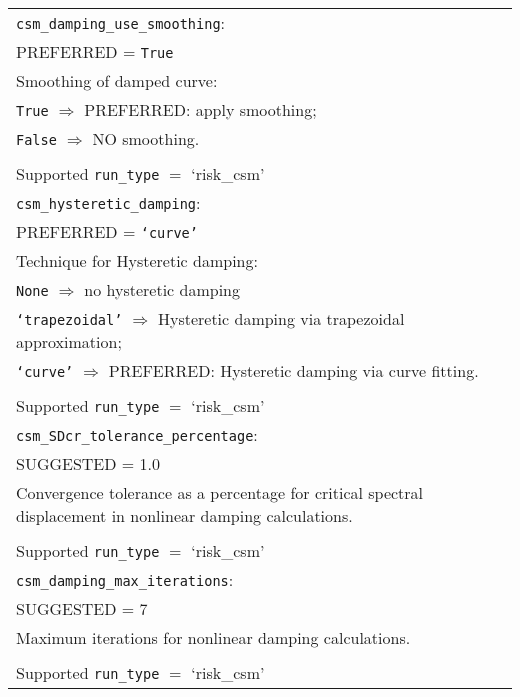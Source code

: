 \vspace{2em}
\begin{tabular}{|p{\textwidth}|}
\hline \vspace{0.1em} \texttt{csm\_damping\_use\_smoothing}: \\
PREFERRED = \texttt{True} \\
Smoothing of damped curve: \\
 \hspace{0.5em} \texttt{True} $\Rightarrow$ \small{PREFERRED}: apply smoothing; \\
 \hspace{0.5em} \texttt{False} $\Rightarrow$ NO smoothing.\\
\\
Supported \texttt{run\_type} $=$ `risk\_csm' \\
\hline \vspace{0.1em} \texttt{csm\_hysteretic\_damping}: \\
PREFERRED = \texttt{`curve'} \\
Technique for Hysteretic  damping: \\
 \hspace{0.5em} \texttt{None} $\Rightarrow$ no hysteretic  damping \\
 \hspace{0.5em} \texttt{`trapezoidal'} $\Rightarrow$ Hysteretic  damping via trapezoidal approximation; \\
 \hspace{0.5em} \texttt{`curve'} $\Rightarrow$ \small{PREFERRED}: Hysteretic  damping via curve fitting. \\
 \\
Supported \texttt{run\_type} $=$ `risk\_csm' \\
\hline \vspace{0.1em} \texttt{csm\_SDcr\_tolerance\_percentage}: \\
SUGGESTED = 1.0 \\
Convergence tolerance as a percentage for critical spectral
displacement in nonlinear damping calculations. \\
\\
Supported \texttt{run\_type} $=$ `risk\_csm' \\
\hline \vspace{0.1em} \texttt{csm\_damping\_max\_iterations}: \\
SUGGESTED = 7 \\
 Maximum iterations for nonlinear damping calculations.\\
 \\
Supported \texttt{run\_type} $=$ `risk\_csm' \\
 \hline
 \end{tabular}


